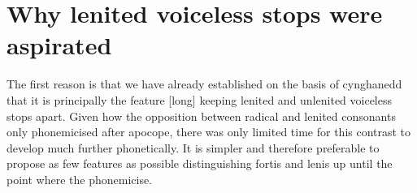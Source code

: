 

\section{Why lenited voiceless stops were aspirated}
The first reason is that we have already established on the basis of cynghanedd that it is principally the feature [long] keeping lenited and unlenited voiceless stops apart. Given how the opposition between radical and lenited consonants only phonemicised after apocope, there was only limited time for this contrast to develop much further phonetically. It is simpler and therefore preferable to propose as few features as possible distinguishing fortis and lenis up until the point where the phonemicise. 




